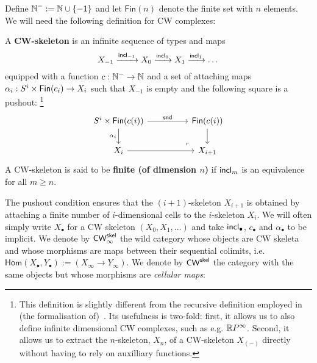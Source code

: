 \documentclass[a4page]{article}
\begin{document}
Define $\textsf{$\mathbb{N}$}^{-} := \textsf{$\mathbb{N}$} \cup \{-1\}$ and let $\mathsf{Fin}(n)$ denote the finite
set with $n$ elements. We will need the following definition for CW complexes:
%
\begin{definition}[CW skeleta]
  A \textbf{CW-skeleton} is an infinite sequence of types and maps
  \[X_{-1} \xrightarrow{\textnormal{\ensuremath{\mathsf{incl}_{-1}}}} X_0 \xrightarrow{\textnormal{\ensuremath{\mathsf{incl}_{0}}}} X_1 \xrightarrow{\textnormal{\ensuremath{\mathsf{incl}_{1}}}} \dots \]
  equipped with a function $c : \textsf{$\mathbb{N}$}^- \to \textsf{$\mathbb{N}$}$ and a set of attaching maps $\alpha_i : S^i \times \textnormal{\ensuremath{\mathsf{Fin}({c_i})}} \to X_i$ such that $X_{-1}$ is empty and the following square is a pushout:
  \footnote{This definition is slightly different from the
  recursive definition employed in (the formalisation
  of)~\cite{BuchholtzFavonia18}. Its usefulness is two-fold: first, it
  allows us to also define infinite dimensional CW complexes, such as
  e.g. $\textnormal{\ensuremath{\mathbb{R}P^\infty}}$. Second, it allows us to extract the $n$-skeleton,
  $X_n$, of a CW-skeleton $X_{(-)}$ directly without having to rely on
  auxilliary functions.}
  \[
\begin{tikzcd}[ampersand replacement=\&]
	{S^{i} \times \fin{c(i)}} \&\& \fin{c(i)} \\
	{X_i} \&\& {X_{i+1}}
	\arrow["{\mathsf{snd}}", from=1-1, to=1-3]
	\arrow["{\alpha_{i}}"', from=1-1, to=2-1]
	\arrow[from=2-1, to=2-3]
	\arrow[from=1-3, to=2-3]
	\arrow["\lrcorner"{anchor=center, pos=0.125, rotate=180}, draw=none, from=2-3, to=1-1]
\end{tikzcd}
\]
A CW-skeleton is said to be \textbf{finite (of dimension $n$)} if $\textnormal{\ensuremath{\mathsf{incl}_{m}}}$ is
an equivalence for all $m \geq n$.
\end{definition}
%
The pushout condition ensures that the \( (i+1) \)-skeleton \( X_{i+1} \) is
obtained by attaching a finite number of \( i \)-dimensional cells to the
\( i \)-skeleton \( X_i \).
%
We will often simply write $X_\bullet$ for a CW skeleton $(X_0,X_1,\dots)$ and
take $\textnormal{\ensuremath{\mathsf{incl}_{\bullet}}}$, $c_{\bullet}$ and $ \alpha_{\bullet}$ to be implicit.
%
We denote by $\textnormal{\ensuremath{\mathsf{CW}_\infty^{\mathsf{skel}}}}$ the wild category whose objects are CW skeleta and
whose morphisms are maps between their sequential colimits, i.e.
$\mathsf{Hom}(X_\bullet,Y_\bullet) := (X_\infty \to Y_\infty)$.
%
We denote by $\textnormal{\ensuremath{\mathsf{CW}^{\mathsf{skel}}}}$ the category with the same objects but whose
morphisms are \emph{cellular maps}:
%
\end{document}
